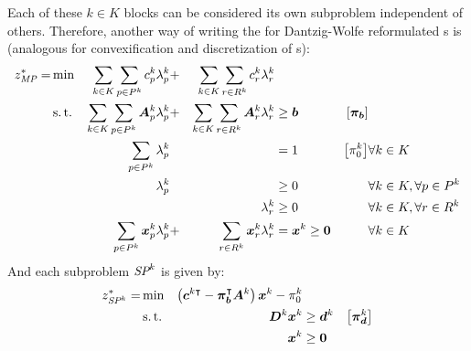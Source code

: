 Each of these $k \in K$ blocks can be considered its own subproblem independent of others. Therefore, another way of writing the \MP{} for Dantzig-Wolfe reformulated \LP{}s is (analogous for convexification and discretization of \IP{}s):
\begin{equation}
\begin{aligned}
z^*_{\textit{MP}}{} = &\min & \sum_{k \in K}\sum_{p \in P^k} c_p^k \lambda_p^k & + & \sum_{k \in K}\sum_{r \in R^k} c_r^k \lambda_r^k & & & \\
&\operatorname{s.t.} & \sum_{k \in K}\sum_{p \in P^k} {\bm{A}}_p^k \lambda_p^k & + & \sum_{k \in K}\sum_{r \in R^k} {\bm{A}}_r^k \lambda_r^k & \geq {\bm{b}} & \left[{\bm{\pi}}_{\bm{b}}\right] & \\
&& \sum_{p \in P^k} \lambda_p^k & & & = 1 & \left[\pi_0^k \right] & \forall k \in K \\
&& \lambda_p^k & & & \geq 0 & & \forall k \in K, \forall p \in P^k \\
&& & & \lambda_r^k & \geq 0 & & \forall k \in K, \forall r \in R^k \\
&& \sum_{p \in P^k} {\bm{x}}_p^k \lambda_p^k & + & \sum_{r \in R^k} {\bm{x}}_r^k \lambda_r^k & = {\bm{x}}^k \geq {\bm{0}} & & \forall k \in K
\end{aligned}
\end{equation}
And each subproblem $\SP{k}$ is given by:
\begin{equation}
\begin{aligned}
z^*_\SP{k} = &\min & \left( \vec{c}^{k \intercal} - \vec{\pi}_\vec{b}\transpose \mat{A}^k \right) \vec{x}^k - \pi_0^k & & \\
&\st & \mat{D}^k \vec{x}^k & \geq \vec{d}^k & \left[\vec{\pi}_\vec{d}^k\right] \\
&& \vec{x}^k & \geq \vec{0}
\end{aligned}
\end{equation}

